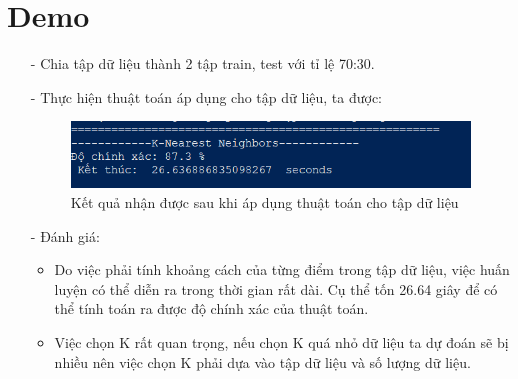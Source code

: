 \documentclass{report}
\begin{document}
    \section{Demo}
        \fontsize{13}{10}\selectfont
        \begin{enumerate}
            \item [- ] Chia tập dữ liệu thành 2 tập train, test với tỉ lệ 70:30.
            
            \item [- ] Thực hiện thuật toán áp dụng cho tập dữ liệu, ta được:
                \begin{center}
                    \begin{figure}[htp]
                        \begin{center}
                            \includegraphics[scale = 1.2]{image/KNN.png}
                            \caption{Kết quả nhận được sau khi áp dụng thuật toán cho tập dữ liệu}
                        \end{center}
                    \end{figure}
                \end{center}
                
            \item [- ] Đánh giá:
                \begin{itemize}
                    \item Do việc phải tính khoảng cách của từng điểm trong tập dữ liệu, việc huấn luyện có thể diễn ra trong thời gian rất dài. Cụ thể tốn 26.64 giây để có thể tính toán ra được độ chính xác của thuật toán.
                    \item Việc chọn K rất quan trọng, nếu chọn K quá nhỏ dữ liệu ta dự đoán sẽ bị nhiều nên việc chọn K phải dựa vào tập dữ liệu và số lượng dữ liệu.
                \end{itemize}
                    
            \pagebreak
        

\end{enumerate}
\end{document}
